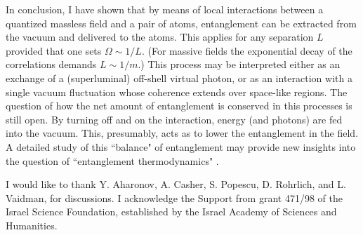 \documentclass[12pt]{article}
\begin{document}
In conclusion, I have shown that by means of
local interactions between a quantized massless field and a pair of atoms,
entanglement can be extracted from the vacuum
and delivered to the atoms.  This applies for any
separation $L$ provided that one sets  $\Omega\sim 1/L$.
(For massive fields the exponential decay
of the correlations demands $L\sim1/m$.)
This process may be interpreted either as
an exchange of a (superluminal) off-shell virtual
photon, or as an  interaction with a single vacuum
fluctuation whose coherence extends over
space-like regions.
The question of how the net amount of entanglement is
conserved in this processes is still open.
By turning  off and on the interaction,
energy (and photons) are fed into the vacuum. This, presumably,
acts as to lower the entanglement in the field.
A detailed study of this ``balance" of entanglement may provide
new insights into the question of ``entanglement thermodynamics"
\cite{popescu&rohrlich}.


I would like to thank Y. Aharonov, A. Casher, S. Popescu,
D. Rohrlich, and L. Vaidman, for discussions.
I acknowledge the Support from grant 471/98 of the Israel Science Foundation, established by the Israel Academy of Sciences and Humanities.
\end{document}
